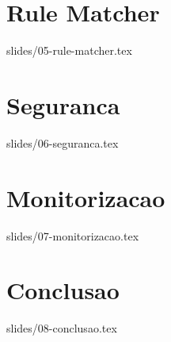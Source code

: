 \documentclass{beamer}
\begin{document}
\section{Rule Matcher}
{slides/05-rule-matcher.tex}

\section{Seguranca}
{slides/06-seguranca.tex}

\section{Monitorizacao}
{slides/07-monitorizacao.tex}

\section{Conclusao}
{slides/08-conclusao.tex}
\end{document}
